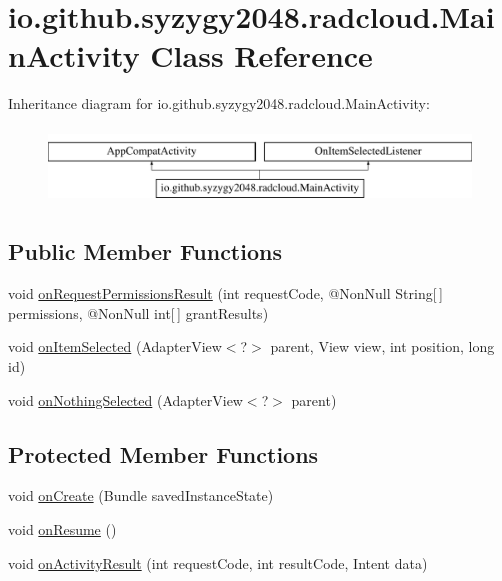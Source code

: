 \hypertarget{classio_1_1github_1_1syzygy2048_1_1radcloud_1_1_main_activity}{}\section{io.\+github.\+syzygy2048.\+radcloud.\+Main\+Activity Class Reference}
\label{classio_1_1github_1_1syzygy2048_1_1radcloud_1_1_main_activity}
Inheritance diagram for io.\+github.\+syzygy2048.\+radcloud.\+Main\+Activity\+:\begin{figure}[H]
\begin{center}
\leavevmode
\includegraphics[height=2.000000cm]{classio_1_1github_1_1syzygy2048_1_1radcloud_1_1_main_activity}
\end{center}
\end{figure}
\subsection*{Public Member Functions}
\begin{DoxyCompactItemize}
\item 
void \mbox{\hyperlink{classio_1_1github_1_1syzygy2048_1_1radcloud_1_1_main_activity_aadc64331c63553c85bfc45ce9cee66b2}{on\+Request\+Permissions\+Result}} (int request\+Code, @Non\+Null String\mbox{[}$\,$\mbox{]} permissions, @Non\+Null int\mbox{[}$\,$\mbox{]} grant\+Results)
\item 
void \mbox{\hyperlink{classio_1_1github_1_1syzygy2048_1_1radcloud_1_1_main_activity_a1c009aced689f6a8c7e292db427d93b1}{on\+Item\+Selected}} (Adapter\+View$<$?$>$ parent, View view, int position, long id)
\item 
void \mbox{\hyperlink{classio_1_1github_1_1syzygy2048_1_1radcloud_1_1_main_activity_ac36d766cbb4525f9c909e43376dec28e}{on\+Nothing\+Selected}} (Adapter\+View$<$?$>$ parent)
\end{DoxyCompactItemize}
\subsection*{Protected Member Functions}
\begin{DoxyCompactItemize}
\item 
void \mbox{\hyperlink{classio_1_1github_1_1syzygy2048_1_1radcloud_1_1_main_activity_a3f1dec2ae5371ebbd577d105c8834d74}{on\+Create}} (Bundle saved\+Instance\+State)
\item 
void \mbox{\hyperlink{classio_1_1github_1_1syzygy2048_1_1radcloud_1_1_main_activity_a9ede421e0220985892cd18f87d0b8bba}{on\+Resume}} ()
\item 
void \mbox{\hyperlink{classio_1_1github_1_1syzygy2048_1_1radcloud_1_1_main_activity_ad31d9aa9ec5da472c81e8b9d4e653bba}{on\+Activity\+Result}} (int request\+Code, int result\+Code, Intent data)
\end{DoxyCompactItemize}


